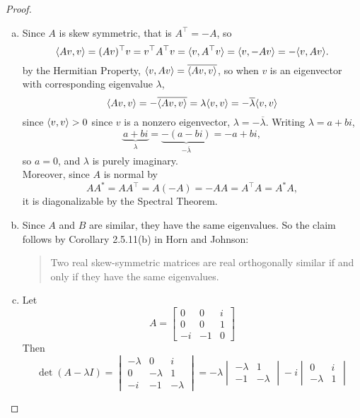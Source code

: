 \documentclass{article}
\begin{document}
\begin{proof} ~
  \begin{enumerate}[(a)]
    \item Since $A$ is skew symmetric, that is $A^\top = -A$, so \[
      \langle Av, v \rangle = (Av)^\top v = v^\top A^\top v = \langle v, A^\top v \rangle = \langle v, -Av \rangle = -\langle v, Av \rangle.
    \] by the Hermitian Property, $\langle v, Av \rangle = \overline{\langle Av, v \rangle}$, so
    when $v$ is an eigenvector with corresponding eigenvalue $\lambda$, \[
      \langle Av, v \rangle
      = -\overline{\langle Av, v \rangle}
      = \lambda\langle v, v \rangle
      = -\overline\lambda\langle v, v \rangle
    \] since $\langle v, v \rangle > 0$ since $v$ is a nonzero eigenvector, $\lambda = -\overline{\lambda}$. Writing $\lambda = a + bi$, \[
      \underbrace{a + bi}_\lambda
      = \underbrace{-(a - bi)}_{-\overline\lambda}
      = -a + bi,
    \] so $a = 0$, and $\lambda$ is purely imaginary.
    \\
    Moreover, since $A$ is normal by \[
      AA^* = AA^\top = A(-A) = -AA = A^\top A = A^*A,
    \] it is diagonalizable by the Spectral Theorem.
    \item Since $A$ and $B$ are similar, they have the same eigenvalues. So the
    claim follows by Corollary 2.5.11(b) in Horn and Johnson:
    \begin{quote}Two real skew-symmetric matrices are real orthogonally similar if and only if they have the same eigenvalues.\end{quote}
    \item Let \[
      A = \begin{bmatrix}
        0  & 0  & i \\
        0  & 0  & 1 \\
        -i & -1 & 0
      \end{bmatrix}
    \]
    Then \[
      \det(A - \lambda I) =
      \begin{vmatrix}
        -\lambda  & 0  & i \\
        0  & -\lambda  & 1 \\
        -i & -1 & -\lambda
      \end{vmatrix}
      = -\lambda\begin{vmatrix}
        -\lambda & 1 \\
        -1 & -\lambda
      \end{vmatrix}
      -i\begin{vmatrix}
        0 & i \\
        -\lambda & 1
      \end{vmatrix}
\]
\end{enumerate}
\end{proof}
\end{document}
